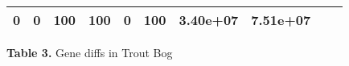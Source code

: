 \documentclass[]{article}
\begin{document}
\begin{longtable}[]{@{}lccccccccc@{}}
\begin{minipage}[t]{0.08\columnwidth}
0\strut
\end{minipage} & \begin{minipage}[t]{0.08\columnwidth}\centering\strut
0\strut
\end{minipage} & \begin{minipage}[t]{0.08\columnwidth}\centering\strut
100\strut
\end{minipage} & \begin{minipage}[t]{0.08\columnwidth}\centering\strut
100\strut
\end{minipage} & \begin{minipage}[t]{0.08\columnwidth}\centering\strut
0\strut
\end{minipage} & \begin{minipage}[t]{0.08\columnwidth}\centering\strut
100\strut
\end{minipage} & \begin{minipage}[t]{0.08\columnwidth}\centering\strut
3.40e+07\strut
\end{minipage} & \begin{minipage}[t]{0.08\columnwidth}\centering\strut
7.51e+07\strut
\end{minipage}\tabularnewline
\bottomrule
\end{longtable}

\textbf{Table 3.} Gene diffs in Trout Bog
\end{document}
